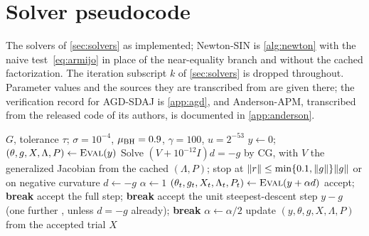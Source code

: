 \clearpage
\section{Solver pseudocode}\label{app:algorithms}

The solvers of \cref{sec:solvers} as implemented; Newton-SIN is
\cref{alg:newton} with the naive test~\eqref{eq:armijo} in place of the
near-equality branch and without the cached factorization. The iteration
subscript $k$ of \cref{sec:solvers} is dropped throughout. Parameter values and
the sources they are transcribed from are given there; the verification record
for AGD-SDAJ is \cref{app:agd}, and Anderson-APM, transcribed from the released
code of its authors, is documented in \cref{app:anderson}.

\begin{algorithm}[H]
\caption{Newton-SIN-BH (semismooth Newton, cached factorization, BH line search)}\label{alg:newton}
\begin{algorithmic}[1]
\Require $G$, tolerance $\tau$; $\sigma=10^{-4}$, $\mu_{\mathrm{BH}}=0.9$, $\gamma=100$, $u=2^{-53}$
\State $y\gets0$;\ $(\theta,g,X,\Lambda,P)\gets\textsc{Eval}(y)$ 
  \State Solve $(V+10^{-12}I)d=-g$ by CG, with $V$ the generalized Jacobian from the cached $(\Lambda,P)$;
  \Statex \hspace{\algorithmicindent} stop at $\lVert r\rVert\le\min\{0.1,\lVert g\rVert\}\lVert g\rVert$ or on negative curvature
   $d\gets-g$ \EndIf
  \State $\alpha\gets1$
  \Loop
    \State $(\theta_t,g_t,X_t,\Lambda_t,P_t)\gets\textsc{Eval}(y+\alpha d)$
     accept; \textbf{break} \EndIf
     
       accept the full step; \textbf{break} \EndIf
      \State accept the unit steepest-descent step $y-g$ (one further \EVD, unless $d=-g$ already); \textbf{break}
    \EndIf
    \State $\alpha\gets\alpha/2$ 
  \EndLoop
  \State update $(y,\theta,g,X,\Lambda,P)$ from the accepted trial 
\EndWhile
\State \Return $X$
\end{algorithmic}
\end{algorithm}

